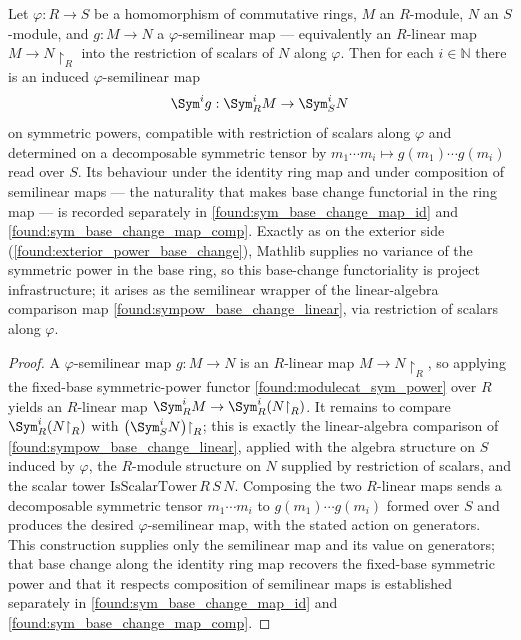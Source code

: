 \begin{lemma}
  \label{found:sym_power_base_change}
  Let \(\varphi:R\to S\) be a homomorphism of commutative rings, \(M\) an
  \(R\)-module, \(N\) an \(S\)-module, and \(g:M\to N\) a \(\varphi\)-semilinear
  map --- equivalently an \(R\)-linear map \(M\to N{\restriction}_R\) into the
  restriction of scalars of \(N\) along \(\varphi\).  Then for each
  \(i\in\mathbb N\) there is an induced \(\varphi\)-semilinear map
  \[
    \Sym^i g:\Sym^i_R M\to\Sym^i_S N
  \]
  on symmetric powers, compatible with restriction of scalars along \(\varphi\)
  and determined on a decomposable symmetric tensor by
  \(m_1\cdots m_i\mapsto g(m_1)\cdots g(m_i)\) read over \(S\).  Its behaviour
  under the identity ring map and under composition of semilinear maps --- the
  naturality that makes base change functorial in the ring map --- is recorded
  separately in \cref{found:sym_base_change_map_id} and
  \cref{found:sym_base_change_map_comp}.  Exactly as on the exterior side
  (\cref{found:exterior_power_base_change}), Mathlib supplies no variance of the
  symmetric power in the base ring, so this base-change functoriality is project
  infrastructure; it arises as the semilinear wrapper of the linear-algebra comparison
  map \cref{found:sympow_base_change_linear}, via restriction of scalars along \(\varphi\).
\end{lemma}

\begin{proof}
  \leanok
  A \(\varphi\)-semilinear map \(g:M\to N\) is an \(R\)-linear map
  \(M\to N{\restriction}_R\), so applying the fixed-base symmetric-power functor
  \cref{found:modulecat_sym_power} over \(R\) yields an \(R\)-linear map
  \(\Sym^i_R M\to\Sym^i_R(N{\restriction}_R)\).  It remains to compare
  \(\Sym^i_R(N{\restriction}_R)\) with \(\bigl(\Sym^i_S N\bigr){\restriction}_R\);
  this is exactly the linear-algebra comparison of
  \cref{found:sympow_base_change_linear}, applied with the algebra structure on
  \(S\) induced by \(\varphi\), the \(R\)-module structure on \(N\) supplied by
  restriction of scalars, and the scalar tower \(\mathrm{IsScalarTower}\,R\,S\,N\).
  Composing the two \(R\)-linear maps sends a decomposable symmetric tensor
  \(m_1\cdots m_i\) to
  \(g(m_1)\cdots g(m_i)\) formed over \(S\) and produces the desired
  \(\varphi\)-semilinear map, with the stated action on generators.  This
  construction supplies only the semilinear map and its value on generators; that
  base change along the identity ring map recovers the fixed-base symmetric power
  and that it respects composition of semilinear maps is established separately in
  \cref{found:sym_base_change_map_id} and \cref{found:sym_base_change_map_comp}.
\end{proof}

